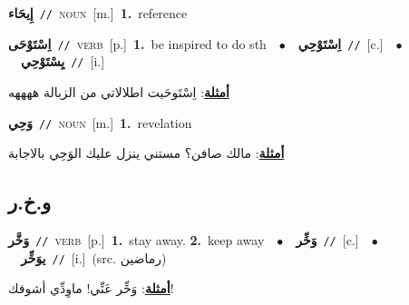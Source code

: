 \documentclass[10pt,a4paper,twoside]{article} %
\begin{document}
\begin{multicols}{2}
{\setlength\topsep{0pt}\textbf{\foreignlanguage{arabic}{إِيحَاء}}\ {\color{gray}\texttt{//}\color{black}}\ \textsc{noun}\ [m.]\ \textbf{1.}~reference\ } \vspace{2mm}

{\setlength\topsep{0pt}\textbf{\foreignlanguage{arabic}{اِسْتَوْحَى}}\ {\color{gray}\texttt{//}\color{black}}\ \textsc{verb}\ [p.]\ \textbf{1.}~be inspired to do sth\ \ $\bullet$\ \ \setlength\topsep{0pt}\textbf{\foreignlanguage{arabic}{اِسْتَوْحِي}}\ {\color{gray}\texttt{//}\color{black}}\ [c.]\ \ $\bullet$\ \ \setlength\topsep{0pt}\textbf{\foreignlanguage{arabic}{يِسْتَوْحِي}}\ {\color{gray}\texttt{//}\color{black}}\ [i.]\  \begin{flushright}\color{gray}\foreignlanguage{arabic}{\textbf{\underline{\foreignlanguage{arabic}{أمثلة}}}: اِسْتَوحَيت اطلالاتي من الزبالة ههههه}\end{flushright}\color{black}} \vspace{2mm}

{\setlength\topsep{0pt}\textbf{\foreignlanguage{arabic}{وَحِي}}\ {\color{gray}\texttt{//}\color{black}}\ \textsc{noun}\ [m.]\ \textbf{1.}~revelation\  \begin{flushright}\color{gray}\foreignlanguage{arabic}{\textbf{\underline{\foreignlanguage{arabic}{أمثلة}}}: مالك صافن؟ مستني ينزل عليك الوَحِي بالاجابة}\end{flushright}\color{black}} \vspace{2mm}

\vspace{-3mm}
\subsection*{\color{blue}\foreignlanguage{arabic}{و.خ.ر}\color{blue}{}} 

{\setlength\topsep{0pt}\textbf{\foreignlanguage{arabic}{وَخَّر}}\ {\color{gray}\texttt{//}\color{black}}\ \textsc{verb}\ [p.]\ \textbf{1.}~stay away.  \textbf{2.}~keep away\ \ $\bullet$\ \ \setlength\topsep{0pt}\textbf{\foreignlanguage{arabic}{وَخِّر}}\ {\color{gray}\texttt{//}\color{black}}\ [c.]\ \ $\bullet$\ \ \setlength\topsep{0pt}\textbf{\foreignlanguage{arabic}{يوَخِّر}}\ {\color{gray}\texttt{//}\color{black}}\ [i.]\ (src. \color{gray}\foreignlanguage{arabic}{رماضين}\color{black})\  \begin{flushright}\color{gray}\foreignlanguage{arabic}{\textbf{\underline{\foreignlanguage{arabic}{أمثلة}}}: وَخِّر عَنِّي! ماوِدِّي أشوفك!}\end{flushright}\color{black}} \vspace{2mm}


\end{multicols}
\end{document}
